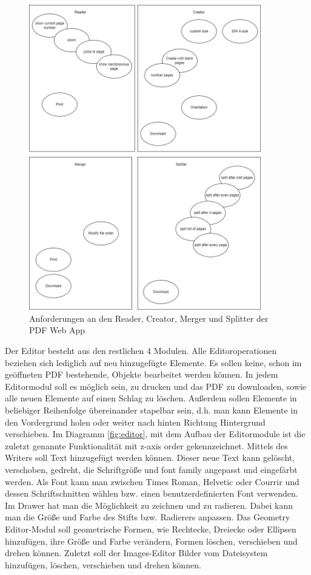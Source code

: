 \begin{figure}[!htbp]
	\centering
	\includegraphics[width=0.9\textwidth]{"images/app-funktionen-anforderungen.png"}
	\caption{Anforderungen an den Reader, Creator, Merger und Splitter der PDF Web App}
	\label{fig:modules4}
\end{figure}

Der Editor besteht aus den restlichen 4 Modulen. Alle Editoroperationen beziehen sich lediglich auf neu hinzugefügte Elemente. Es sollen keine, schon im geöffneten PDF bestehende, Objekte bearbeitet werden können. In jedem Editormodul soll es möglich sein, zu drucken und das PDF zu downloaden, sowie alle neuen Elemente auf einen Schlag zu löschen. Außerdem sollen Elemente in beliebiger Reihenfolge übereinander stapelbar sein, d.h. man kann Elemente in den Vordergrund holen oder weiter nach hinten Richtung Hintergrund verschieben. Im Diagramm \ref{fig:editor}, mit dem Aufbau der Editormodule ist die zuletzt genannte Funktionalität mit z-axis order gekennzeichnet. Mittels des Writers soll Text hinzugefügt werden können. Dieser neue Text kann gelöscht, verschoben, gedreht, die Schriftgröße und font family angepasst und eingefärbt werden. Als Font kann man zwischen Times Roman, Helvetic oder Courrir und dessen Schriftschnitten wählen bzw. einen benutzerdefinierten Font verwenden. Im Drawer hat man die Möglichkeit zu zeichnen und zu radieren. Dabei kann man die Größe und Farbe des Stifts bzw. Radierers anpassen. Das Geometry Editor-Modul soll geometrische Formen, wie Rechtecke, Dreiecke oder Ellipsen hinzufügen, ihre Größe und Farbe verändern, Formen löschen, verschieben und drehen können. Zuletzt soll der Images-Editor Bilder vom Dateisystem hinzufügen, löschen, verschieben und drehen können.

